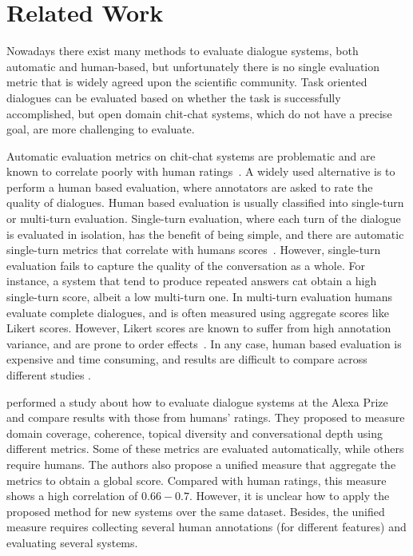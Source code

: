 \documentclass[11pt,a4paper]{article}
\begin{document}
\section{Related Work}

Nowadays there exist many methods to evaluate dialogue systems, both automatic and human-based, but unfortunately there is no single evaluation metric that is widely agreed upon the scientific community. Task oriented dialogues can be evaluated based on whether the task is successfully accomplished, but open domain chit-chat systems, which do not have a precise goal, are more challenging to evaluate.


Automatic evaluation metrics on chit-chat systems are problematic and are known to correlate poorly with human ratings~\cite{liu-etal-2016-evaluate,lowe-etal-2017-towards}. A widely used alternative is to perform a human based evaluation, where annotators are asked to rate the quality of dialogues. Human based evaluation is usually classified into single-turn or multi-turn evaluation. Single-turn evaluation, where each turn of the dialogue is evaluated in isolation, has the benefit of being simple, and there are automatic single-turn metrics that correlate with humans scores~\cite{mehri2020usr}. However, single-turn evaluation fails to capture the quality of the conversation as a whole. For instance, a system that tend to produce repeated answers cat obtain a high single-turn score, albeit a low multi-turn one. In multi-turn evaluation humans evaluate complete dialogues, and is often measured using aggregate scores like Likert scores. However, Likert scores are known to suffer from high annotation variance, and are prone to order effects~\cite{amidei-etal-2019-use}. In any case, human based evaluation is expensive and time consuming, and results are difficult to compare across different studies \cite{van-der-lee-etal-2019-best,amidei2019agreement}. 

\citet{venkatesh2018evaluating} performed a study about how to evaluate dialogue systems at the Alexa Prize and compare results with those from humans' ratings. They proposed to measure domain coverage, coherence, topical diversity and conversational depth using different metrics. Some of these metrics are evaluated automatically, while others require humans. The authors also propose a unified measure that aggregate the metrics to obtain a global score. Compared with human ratings, this measure shows a high correlation of $0.66-0.7$. However, it is unclear how to apply the proposed method for new systems over the same dataset. Besides, the unified measure requires collecting several human annotations (for different features) and evaluating several systems.
\end{document}
